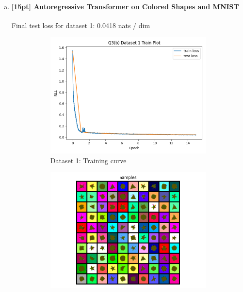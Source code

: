 \documentclass{article}
\begin{document}
\begin{enumerate}[(a)]
\newpage

\item {\bf [15pt] Autoregressive Transformer on Colored Shapes and MNIST} \\\\
Final test loss for dataset 1: 0.0418 nats / dim
\begin{figure}[H]
    \centering
    \begin{subfigure}{0.45\textwidth}
        \centering
        \includegraphics[width=\textwidth]{figures/q3_b_dset1_train_plot.png}
        \caption{Dataset 1: Training curve}
    \end{subfigure}
    \hspace{0.2in}
    \begin{subfigure}{0.45\textwidth}
        \centering
        \includegraphics[width=\textwidth]{figures/q3_b_dset1_samples.png}

\end{subfigure}
\end{figure}
\end{enumerate}
\end{document}
